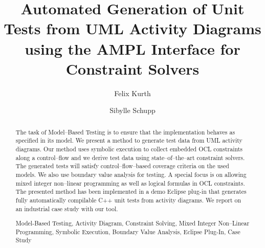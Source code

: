 \documentclass[runningheads,a4paper]{llncs}%
\newcommand{\keywords}[1]{\par\addvspace\baselineskip%
\noindent\keywordname\enspace\ignorespaces#1}%
\begin{document}
%
%
\mainmatter  %
%
\title{Automated Generation of Unit Tests from UML Activity Diagrams using the AMPL Interface for Constraint Solvers}%
%
%
%
%
%
\author{Felix Kurth%
\and Sibylle Schupp}%
%
%
%
%
%
%
%
\maketitle%
%
\begin{abstract}%
The task of Model--Based Testing is to ensure that the implementation behaves as specified in its model. We present a method to generate test data from UML activity diagrams. Our method uses symbolic execution to collect embedded OCL constraints along a control--flow and we derive test data using state--of--the--art constraint solvers. The generated tests will satisfy control--flow--based coverage criteria on the used models. We also use boundary value analysis for testing. A special focus is on allowing mixed integer non--linear programming as well as logical formulas in OCL constraints. The presented method has been implemented in a demo Eclipse plug-in that generates fully automatically compilable C++ unit tests from activity diagrams. We report on an industrial case study with our tool.%
\keywords{Model-Based Testing, Activity Diagram, Constraint Solving, Mixed Integer Non--Linear Programming, Symbolic Execution, Boundary Value Analysis, Eclipse Plug-In, Case Study}%
\end{abstract}%
\end{document}
